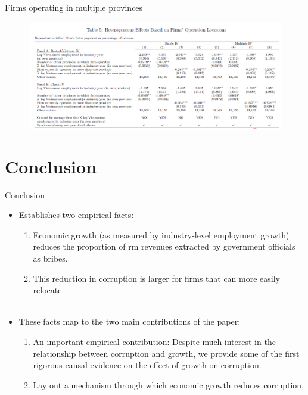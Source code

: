\documentclass{beamer}
\begin{document}
\begin{frame}{Firms operating in multiple provinces}

\begin{figure}
\centering
\includegraphics[width=1\linewidth]{13.png}
\end{figure}

\end{frame}

\section{Conclusion}

\begin{frame}{Conclusion}

\begin{itemize}
\item Establishes two empirical facts:
\begin{enumerate}
\item Economic growth (as measured by industry-level employment growth) reduces the proportion of rm revenues extracted by government officials as bribes.
\item This reduction in corruption is larger for firms that can more easily relocate.\\~
\end{enumerate}

\item These facts map to the two main contributions of the paper:
\begin{enumerate}
\item An important empirical contribution: Despite much interest in the relationship between corruption and growth, we provide some of the first rigorous causal evidence on the effect of growth on corruption.
\item Lay out a mechanism through which economic growth reduces corruption.
\end{enumerate}




\end{itemize}


\end{frame}
\end{document}
